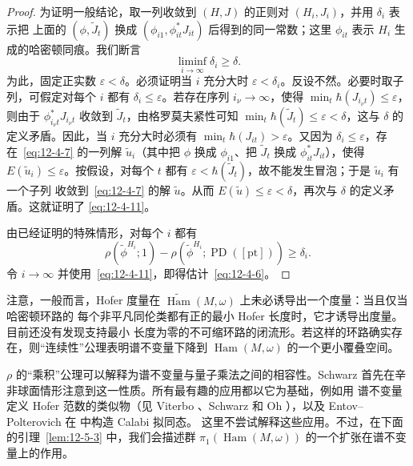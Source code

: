 \begin{proof}
为证明一般结论，取一列收敛到 $(H,J)$ 的正则对 $(H_i,J_i)$，并用 $\delta_i$ 表示把
上面的 $(\phi,\widetilde J_t)$ 换成 $(\phi_{i1},\phi_{it}^*J_{it})$ 后得到的同一常数；这里
$\phi_{it}$ 表示 $H_i$ 生成的哈密顿同痕。我们断言
\begin{equation}\label{eq:12-4-11}
  \liminf_{i\to\infty}\delta_i\ge\delta.
\end{equation}
为此，固定正实数 $\varepsilon<\delta$。必须证明当 $i$ 充分大时
$\varepsilon<\delta_i$。反设不然。必要时取子列，可假定对每个 $i$ 都有
$\delta_i\le\varepsilon$。若存在序列 $i_\nu\to\infty$，使得
$\min_t\hbar(J_{i_\nu t})\le\varepsilon$，则由于
$\phi_{i_\nu t}^*J_{i_\nu t}$ 收敛到 $\widetilde J_t$，由格罗莫夫紧性可知
$\min_t\hbar(\widetilde J_t)\le\varepsilon<\delta$，这与 $\delta$ 的定义矛盾。因此，当
$i$ 充分大时必须有 $\min_t\hbar(J_{it})>\varepsilon$。又因为
$\delta_i\le\varepsilon$，存在~\eqref{eq:12-4-7} 的一列解 $\widetilde u_i$（其中把
$\phi$ 换成 $\phi_{i1}$、把 $\widetilde J_t$ 换成 $\phi_{it}^*J_{it}$），使得
$E(\widetilde u_i)\le\varepsilon$。按假设，对每个 $t$ 都有
$\varepsilon<\hbar(\widetilde J_t)$，故不能发生冒泡；于是 $\widetilde u_i$ 有一个子列
收敛到~\eqref{eq:12-4-7} 的解 $\widetilde u$。从而
$E(\widetilde u)\le\varepsilon<\delta$，再次与 $\delta$ 的定义矛盾。这就证明了
\eqref{eq:12-4-11}。

由已经证明的特殊情形，对每个 $i$ 都有
\[
  \rho(\widetilde\phi^{H_i};1)
  -\rho(\widetilde\phi^{H_i};\operatorname{PD}([\mathrm{pt}]))
  \ge\delta_i.
\]
令 $i\to\infty$ 并使用~\eqref{eq:12-4-11}，即得估计~\eqref{eq:12-4-6}。
\end{proof}

注意，一般而言，Hofer 度量在
$\widetilde{\operatorname{Ham}}(M,\omega)$ 上未必诱导出一个度量：当且仅当哈密顿环路的
每个非平凡同伦类都有正的最小 Hofer 长度时，它才诱导出度量。目前还没有发现支持最小
长度为零的不可缩环路的闭流形。若这样的环路确实存在，则“连续性”公理表明谱不变量下降到
$\operatorname{Ham}(M,\omega)$ 的一个更小覆叠空间。

$\rho$ 的“乘积”公理可以解释为谱不变量与量子乘法之间的相容性。Schwarz
 首先在辛非球面情形注意到这一性质。所有最有趣的应用都以它为基础，例如用
谱不变量定义 Hofer 范数的类似物（见 Viterbo 、Schwarz 
和 Oh ），以及 Entov--Polterovich 在  中构造 Calabi 拟同态。
这里不尝试解释这些应用。不过，在下面的引理~\ref{lem:12-5-3} 中，我们会描述群
$\pi_1(\operatorname{Ham}(M,\omega))$ 的一个扩张在谱不变量上的作用。

